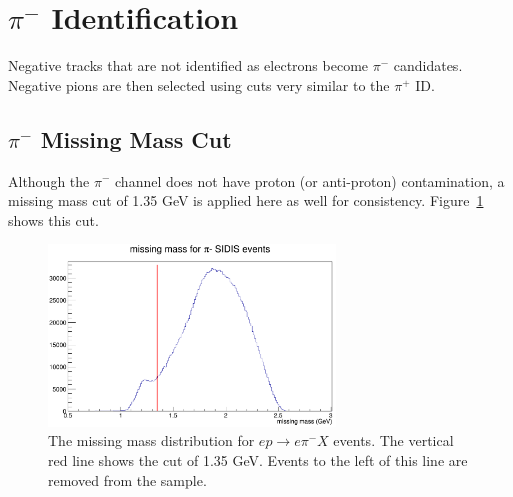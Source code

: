 \clearpage %

%
%
\section{$\pi^-$ Identification}
\label{sec:pimID}
Negative tracks that are not identified as electrons become $\pi^-$ candidates.
Negative pions are then selected using cuts very similar to the $\pi^+$ ID.
%
\subsection{$\pi^-$ Missing Mass Cut}
Although the $\pi^-$ channel does not have proton (or anti-proton) contamination, a missing mass cut of 1.35 GeV is applied here as well for consistency.
Figure~\ref{fig:pimMissingMassCut} shows this cut.
%
\begin{figure}[htp]
\centering
\includegraphics[width=3in]{figures/pimMissingMassCut.png}
\caption{The missing mass distribution for $ep \rightarrow e\pi^- X$ events. The vertical red line shows the cut of 1.35 GeV. Events to the left of this line are removed from the sample.}
\label{fig:pimMissingMassCut}
\end{figure}
%
